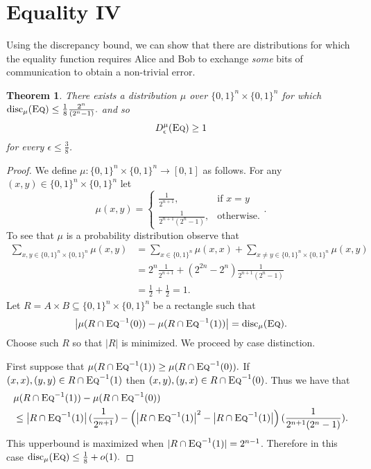\documentclass[11pt]{amsart}
\theoremstyle{plain}
\newtheorem{theorem}{Theorem}
\theoremstyle{definition}
\theoremstyle{plain}
\newcommand{\disc}{\mathrm{disc}}
\newcommand{\Eq}{\textsc{Eq}}
\begin{document}
\newpage \section{Equality IV}

Using the discrepancy bound, we can show that there are distributions for which the equality function requires Alice and Bob to exchange \emph{some} bits of communication to obtain a non-trivial error.

\begin{theorem}
There exists a distribution $\mu$ over $\{0,1\}^n \times \{0,1\}^n$ for which 
$
\disc_\mu(\Eq) \leq \frac18 \frac{2^n}{(2^n-1)}.
$
and so
\[
D^\mu_\epsilon(\Eq) \ge 1
\]
for every $\epsilon \le \frac38$.
\end{theorem}

\begin{proof}
    We define $\mu : \{0,1\}^n  \times \{0,1\}^n \rightarrow [0,1]$ as follows. For any $(x,y) \in \{0,1\}^n\times \{0,1\}^n$ let
    $$ \mu(x,y) = \begin{cases}
        \frac{1}{2^{n+1}}, &\text{if } x=y \\
        \frac{1}{2^{n+1}(2^n-1)}, &\text{otherwise}.
    \end{cases}.$$
    To see that $\mu$ is a probability distribution observe that
    \begin{align*}\sum_{x,y \in \{0,1\}^n\times \{0,1\}^n} \mu(x,y) &= \sum_{x\in\{0,1\}^n}\mu(x,x) + \sum_{x\neq y \in \{0,1\}^n\times \{0,1\}^n} \mu(x,y)\\
     &= 2^n \frac{1}{2^{n+1}} + (2^{2n}-2^n)\frac{1}{2^{n+1}(2^n-1)}\\
    &= \frac{1}{2} + \frac{1}{2} = 1.
    \end{align*}
    Let $R = A\times B \subseteq \{0,1\}^n\times\{0,1\}^n$ be a rectangle such that
    $$\left|\mu(R\cap \Eq^{-1}(0)) - \mu(R\cap \Eq^{-1}(1))\right| = \disc_\mu(\Eq).$$
    Choose such $R$ so that $|R|$ is minimized. We proceed by case distinction. 
    
    First suppose that $\mu(R\cap \Eq^{-1}(1)) \geq \mu(R\cap \Eq^{-1}(0)).$ If $(x,x), (y,y) \in R\cap \Eq^{-1}(1)$ then $(x,y), (y,x) \in R\cap \Eq^{-1}(0)$. Thus we have that 
    \begin{align*}&\mu(R\cap \Eq^{-1}(1)) - \mu(R\cap \Eq^{-1}(0))\\ 
        &\leq \left|R\cap \Eq^{-1}(1)\right|(\frac{1}{2^{n+1}})-\left(\left|R\cap \Eq^{-1}(1)\right|^2-\left|R\cap \Eq^{-1}(1)\right|\right)(\frac{1}{2^{n+1}(2^n-1)}).
    \end{align*}
    This upperbound is maximized when $|R\cap \Eq^{-1}(1)|=2^{n-1}$. Therefore in this case $\disc_\mu(\Eq) \leq \frac{1}{8} + o(1).$
    

\end{proof}
\end{document}
